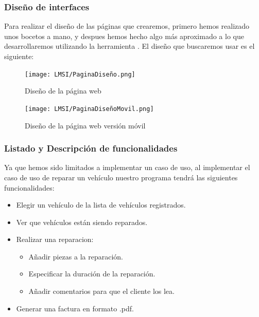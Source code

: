 \documentclass{article}
\begin{document}
\subsubsection{Diseño de interfaces}
Para realizar el diseño de las páginas que crearemos, primero hemos realizado unos bocetos a mano, y despues hemos hecho algo más aproximado a lo que desarrollaremos utilizando
la herramienta \href{https://www.invisionapp.com/home}{\color{red}{InVision}}. El diseño que buscaremos usar es el siguiente:\\
\begin{figure}[H]
  \centering
  \texttt{[image: LMSI/PaginaDiseño.png]}
  \caption{Diseño de la página web}
\end{figure}
\begin{figure}[H]
  \centering
  \texttt{[image: LMSI/PaginaDiseñoMovil.png]}
  \caption{Diseño de la página web versión móvil}
\end{figure}
\subsubsection{Listado y Descripción de funcionalidades}
Ya que hemos sido limitados a implementar un caso de uso, al implementar el caso de uso de reparar un vehículo nuestro programa tendrá las siguientes funcionalidades:\\
\begin{itemize}
  \item Elegir un vehículo de la lista de vehículos registrados.
  \item Ver que vehículos están siendo reparados.
  \item Realizar una reparacion: \begin{itemize}
    \item Añadir piezas a la reparación.
    \item Especificar la duración de la reparación.
    \item Añadir comentarios para que el cliente los lea.
  \end{itemize}
  \item Generar una factura en formato .pdf.
\end{itemize}
\end{document}
